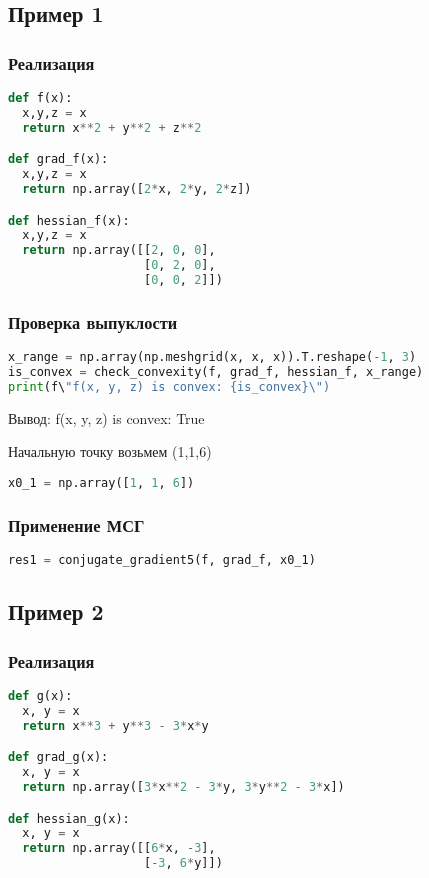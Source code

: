 \documentclass{article}
\begin{document}
\subsection{Пример 1}

\subsubsection{Реализация}
\begin{lstlisting}[language=Python]
def f(x):
  x,y,z = x
  return x**2 + y**2 + z**2

def grad_f(x):
  x,y,z = x
  return np.array([2*x, 2*y, 2*z])

def hessian_f(x):
  x,y,z = x
  return np.array([[2, 0, 0],
                   [0, 2, 0],
                   [0, 0, 2]])
\end{lstlisting}

\subsubsection{Проверка выпуклости}
\begin{lstlisting}[language=Python]
x_range = np.array(np.meshgrid(x, x, x)).T.reshape(-1, 3)
is_convex = check_convexity(f, grad_f, hessian_f, x_range)
print(f\"f(x, y, z) is convex: {is_convex}\")
\end{lstlisting}

Вывод: f(x, y, z) is convex: True

Начальную точку возьмем (1,1,6)

\begin{lstlisting}[language=Python]
x0_1 = np.array([1, 1, 6])
\end{lstlisting}

\subsubsection{Применение МСГ}

\begin{lstlisting}[language=Python]
res1 = conjugate_gradient5(f, grad_f, x0_1)
\end{lstlisting}


\newpage
\subsection{Пример 2}

\subsubsection{Реализация}
\begin{lstlisting}[language=Python]
def g(x):
  x, y = x
  return x**3 + y**3 - 3*x*y

def grad_g(x):
  x, y = x
  return np.array([3*x**2 - 3*y, 3*y**2 - 3*x])

def hessian_g(x):
  x, y = x
  return np.array([[6*x, -3],
                   [-3, 6*y]])
\end{lstlisting}
\end{document}
